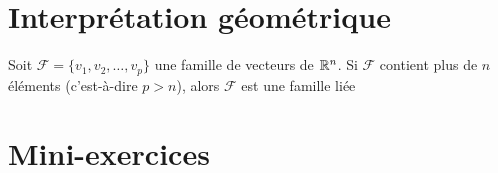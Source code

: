\section{Interprétation géométrique}
%
% 
%
% 

\begin{frame}
\pause




\pause\pause



\begin{proposition}
  Soit $\mathcal{F}=\{ v_1, v_2,\ldots ,v_p\}$ une famille de vecteurs de $\mathbb{R}^n$. Si
  $\mathcal{F}$ contient plus de $n$ éléments (c'est-à-dire $p > n$), alors 
  $\mathcal{F}$ est une famille liée
\end{proposition}

\end{frame}



\section{Mini-exercices}

